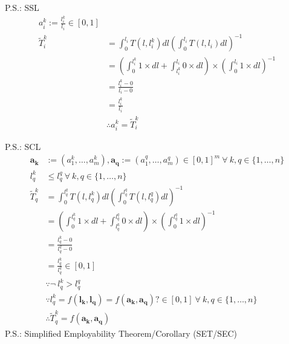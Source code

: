\documentclass[hidelinks, nonatbib]{elsarticle}
\begin{document}
P.S.: SSL
\begin{align}
    a_{i}^{k} := \frac{l_{i}^{k}}{l_{i}} \in [0,1]
    \\
    \tilde{T}_{i}^{k} 
    &= 
    \int_{0}^{l_i}{
        T(l,l_{i}^{k})
        dl
    }
    \left(
        \int_{0}^{l_i}{
            T(l,l_{i})
            dl
        }
    \right) ^ {-1}
    \\
    &= 
    \left(
        \int_{0}^{l_{i}^{k}}{
            1
            \times
            dl
        }
        +
        \int_{l_{i}^{k}}^{l_i}{
            0
            \times
            dl
        }
    \right)
    \times
    \left(
        \int_{0}^{l_i}{
            1
            \times
            dl
        }
    \right) ^ {-1}
    \\
    &= 
    \frac{l_{i}^{k} - 0}{l_{i} - 0}
    \\
    &= 
    \frac{l_{i}^{k}}{l_{i}}
    \\
    &\therefore
    a_{i}^{k} = \tilde{T}_{i}^{k}
\end{align}

P.S.: SCL
\begin{align}
    \boldsymbol{a_k}
    &:= (a_{1}^{k}, \dots, a_{m}^{k})
    ,
    \boldsymbol{a_q}
    := (a_{1}^{q}, \dots, a_{m}^{q})
    \in [0,1]^{m}
    \
    \forall
    \
    k,q \in \{1, \dots, n\}
    \\
    l_{q}^{k}
    &\leq 
    l_{q}^{q}
    \
    \forall
    \
    k,q \in \{1, \dots, n\}
    \\
    \tilde{T}_{q}^{k}
    &= 
    \int_{0}^{l_{q}^{q}}{
        T(l,l_{q}^{k})
        dl
    }
    \left(
        \int_{0}^{l_{q}^{q}}{
            T(l,l_{q}^{q})
            dl
        }
    \right) ^ {-1}
    \\
    &= 
    \left(
        \int_{0}^{l_{q}^{k}}{
            1
            \times
            dl
        }
        +
        \int_{l_{q}^{k}}^{l_{q}^{q}}{
            0
            \times
            dl
        }
    \right)
    \times
    \left(
        \int_{0}^{l_{q}^{q}}{
            1
            \times
            dl
        }
    \right) ^ {-1}
    \\
    &= 
    \frac{l_{q}^{k} - 0}{l_{q}^{q} - 0}
    \\
    &= 
    \frac{l_{q}^{k}}{l_{q}^{q}}
    \in [0,1]
    \\
    &\because
    \neg
    \
    l_{q}^{k}
    >
    l_{q}^{q}
    \\
    &\because
    l_{q}^{k} = 
    f(
        \boldsymbol{l_k},
        \boldsymbol{l_q}
    ) 
    =
    f(
        \boldsymbol{a_k},
        \boldsymbol{a_q}
    )?
    \in [0,1]
    \
    \forall
    \
    k,q \in \{1, \dots, n\}
    \\
    &\therefore
    \tilde{T}_{q}^{k}
    =
    f(
        \boldsymbol{a_k},
        \boldsymbol{a_q}
    )
\end{align}
P.S.: Simplified Employability Theorem/Corollary (SET/SEC)
\end{document}
